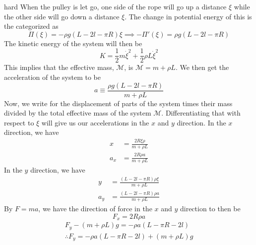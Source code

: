 \begin{solution}{hard}
When the pulley is let go, one side of the rope will go up a distance $\xi$ while the other side will go down a distance $\xi$. The change in potential energy of this is the categorized as 
\[\Pi(\xi) = -\rho g(L - 2l - \pi R)\xi \implies -\Pi'(\xi) = \rho g(L - 2l - \pi R)\]
The kinetic energy of the system will then be 
\[K = \frac{1}{2}m\dot\xi^2 + \frac{1}{2}\rho L\dot\xi^2\]
This implies that the effective mass, $\mathcal{M}$, is $\mathcal{M} = m + \rho L$. We then get the acceleration of the system to be 
\[a \equiv \frac{\rho g(L - 2l - \pi R)}{m + \rho L}\]
Now, we write for the displacement of parts of the system times their mass divided by the total effective mass of the system $\mathcal{M}$. Differentiating that with respect to $\xi$ will give us our accelerations in the $x$ and $y$ direction. In the $x$ direction, we have
\begin{align*}
x &= \frac{2R\xi\rho}{m + \rho L}\\
a_x &= \frac{2R\rho a}{m + \rho L}
\end{align*}
In the $y$ direction, we have 
\begin{align*}
y &= \frac{(L - 2l -\pi R)\rho\xi}{m + \rho L}\\
a_y &= \frac{(L - 2l - \pi R)\rho a}{m + \rho L}
\end{align*}
By $F=ma$, we have the direction of force in the $x$ and $y$ direction to then be 
\[\boxed{F_x = 2R\rho a}\]
\begin{align*}
F_y - (m+\rho L)g = -\rho a (L - \pi R - 2l)\\
\boxed{\therefore F_y = -\rho a(L-\pi R - 2l) + (m + \rho L)g}
\end{align*}
\end{solution}
